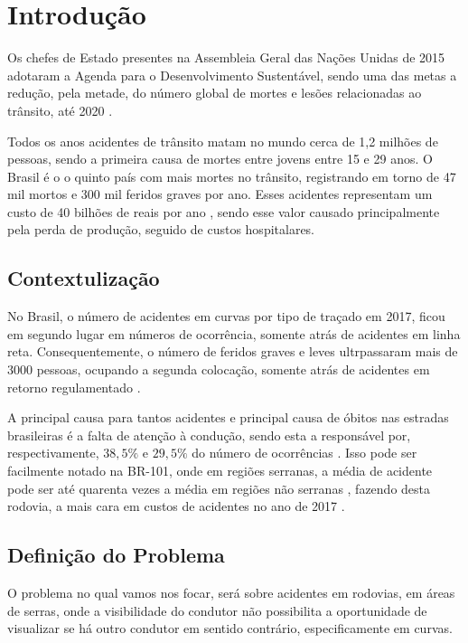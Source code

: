 \chapter{Introdução}

Os chefes de Estado presentes na Assembleia Geral das Nações Unidas de 2015 adotaram a Agenda para o Desenvolvimento Sustentável, sendo uma das metas a redução, pela metade, do número global de mortes e lesões relacionadas ao trânsito, até 2020 \cite{relatorio_oms}.

Todos os anos acidentes de trânsito matam no mundo cerca de 1,2 milhões de pessoas, sendo a primeira causa de mortes entre jovens entre 15 e 29 anos. O Brasil é o o quinto país com mais mortes no trânsito, registrando em torno de 47 mil mortos e 300 mil feridos graves por ano. Esses acidentes representam um custo de 40 bilhões de reais por ano \cite{relatorio_ipea}, sendo esse valor causado principalmente pela perda de produção, seguido de custos hospitalares.

\section{Contextulização}

No Brasil, o número de acidentes em curvas por tipo de traçado em 2017, ficou em segundo lugar em números de ocorrência, somente atrás de acidentes em linha reta. Consequentemente, o número de feridos graves e leves ultrpassaram mais de 3000 pessoas, ocupando a segunda colocação, somente atrás de acidentes em retorno regulamentado \cite{anuario_rodoviario}.

A principal causa para tantos acidentes e principal causa de óbitos nas estradas brasileiras é a falta de atenção à condução, sendo esta a responsável por, respectivamente, $38,5\%$ e $29,5\%$ do número de ocorrências \cite{anuario_rodoviario}. Isso pode ser facilmente notado na BR-101, onde em regiões serranas, a média de acidente pode ser até quarenta vezes a média em regiões não serranas \cite{acidentes}, fazendo desta rodovia, a mais cara em custos de acidentes no ano de 2017 \cite{anuario_rodoviario}.


\section{Definição do Problema}

O problema no qual vamos nos focar, será sobre acidentes em rodovias, em áreas de serras, onde a visibilidade do condutor não possibilita a oportunidade de visualizar se há outro condutor em sentido contrário, especificamente em curvas.

